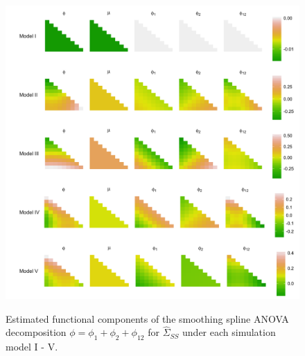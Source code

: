 
\begin{figure}[H] 
\caption{Estimated functional components of the smoothing spline ANOVA decomposition $\phi = \phi_1 + \phi_2 + \phi_{12}$ for $\hat{\Sigma}_{SS}$ under each simulation model I - V.}
  \includegraphics[width = \textwidth]{../img/chapter-4/ssanova-estimate-lattice} \label{fig:ssanova-component-lattice}
\end{figure}